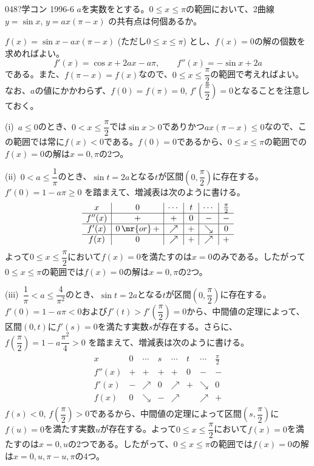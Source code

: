 \begin{prob}{048}{\hosi ?}{学コン 1996-6}
 $a$を実数をとする。$0\le x \le \pi$の範囲において、2曲線 $y=\sin x$, $y=ax(\pi-x)$ の共有点は何個あるか。
\end{prob}
$f(x)=\sin x -ax(\pi-x)$ (ただし$0\le x\le \pi$) とし、$f(x)=0$の解の個数を求めればよい。
\[ f'(x)=\cos x+2ax-a\pi, \qquad f''(x)=-\sin x + 2a \]
である。また、$f(\pi-x)=f(x)$なので、$0\le x\le \dfrac{\pi}{2}$の範囲で考えればよい。なお、$a$の値にかかわらず、$f(0)=f(\pi)=0$, $f'\left(\dfrac{\pi}{2}\right)=0$となることを注意しておく。

(i)~$a\le 0$のとき、$0< x\le \dfrac{\pi}{2}$では$\sin x>0$でありかつ$ax(\pi-x)\le 0$なので、この範囲では常に$f(x)<0$である。$f(0)=0$であるから、$0\le x\le \pi$の範囲での$f(x)=0$の解は$x=0, \pi$の2つ。

(ii)~$0<a\le\dfrac{1}{\pi}$のとき、$\sin t=2a$となる$t$が区間$\left(0, \dfrac{\pi}{2} \right)$に存在する。$f'(0)=1-a\pi\ge 0$ を踏まえて、増減表は次のように書ける。
\begin{align*}
 \begin{array}{c|c|c|c|c|c}
  x & 0 & \cdots & t & \cdots & \frac{\pi}{2} \\ \hline
  f''(x) & + & + & 0 & - & - \\ \hline
  f'(x) & 0 \,\mr{or}\, + & \nearrow & + & \searrow & 0 \\ \hline
  f(x) & 0 & \nearrow & + & \nearrow & + 
 \end{array}
\end{align*}
よって$0\le x\le \dfrac{\pi}{2}$において$f(x)=0$を満たすのは$x=0$のみである。したがって$0\le x\le \pi$の範囲では$f(x)=0$の解は$x=0, \pi$の2つ。

(iii)~$\dfrac{1}{\pi}<a\le\dfrac{4}{\pi^2}$のとき、$\sin t=2a$となる$t$が区間$\left(0, \dfrac{\pi}{2} \right)$に存在する。$f'(0)=1-a\pi< 0$および$f'(t)>f'\left(\dfrac{\pi}{2}\right)=0$から、中間値の定理によって、区間$(0,t)$に$f'(s)=0$を満たす実数$s$が存在する。さらに、$f\left(\dfrac{\pi}{2}\right)=1-a\dfrac{\pi^2}{4}>0$ を踏まえて、増減表は次のように書ける。
\begin{align*}
 \begin{array}{c|c|c|c|c|c|c|c}
  x & 0 & \cdots & s & \cdots & t & \cdots & \frac{\pi}{2} \\ \hline
  f''(x) & + & + & + & + & 0 & - & - \\ \hline
  f'(x) & - & \nearrow & 0 & \nearrow &  + & \searrow & 0 \\ \hline
  f(x) & 0 & \searrow & - & \nearrow & & \nearrow & +
 \end{array}
\end{align*}
$f(s)<0$, $f\left(\dfrac{\pi}{2}\right)>0$であるから、中間値の定理によって区間$\left(s, \dfrac{\pi}{2}\right)$に$f(u)=0$を満たす実数$u$が存在する。よって$0\le x\le\dfrac{\pi}{2}$において$f(x)=0$を満たすのは$x=0, u$の2つである。したがって、$0\le x\le \pi$の範囲では$f(x)=0$の解は$x=0, u, \pi-u, \pi$の4つ。

